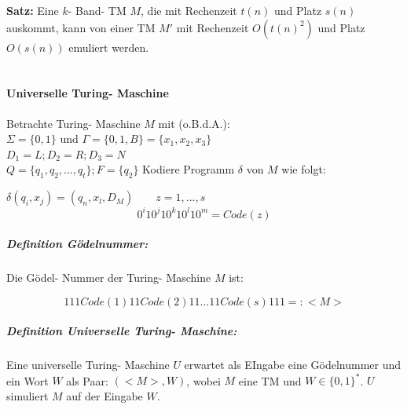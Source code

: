 \documentclass[fleqn]{scrartcl}
\begin{document}
\textbf{Satz:} Eine $k$- Band- TM $M$, die mit Rechenzeit $t(n)$ und Platz $s(n)$ auskommt, kann von einer TM $M'$ mit Rechenzeit $O(t(n)^2)$ und Platz $O(s(n))$ emuliert werden.\\\\
 
 \newpage
\paragraph{Universelle Turing- Maschine}
Betrachte Turing- Maschine $M$ mit (o.B.d.A.):\\
$\Sigma = \{0, 1\}$ und $\Gamma = \{0, 1, B\} = \{x_1, x_2, x_3\}$\\
$D_1 = L; D_2 = R; D_3 = N$\\
$Q = \{q_1, q_2, ..., q_t\}; F = \{q_2\}$
Kodiere Programm $\delta$ von $M$ wie folgt:

$\delta (q_i, x_j) = (q_n, x_l, D_M) \quad \quad z = 1, ..., s$
\[0^i10^j10^k10^l10^m = Code(z)\]

\subparagraph{Definition Gödelnummer:} Die Gödel- Nummer der Turing- Maschine $M$ ist: 

\[111Code(1)11Code(2)11...11Code(s)111 =: <M>\] 

\subparagraph{Definition Universelle Turing- Maschine:} Eine universelle Turing- Maschine $U$ erwartet als EIngabe eine Gödelnummer und ein Wort $W$ als Paar: $(<M>, W)$, wobei $M$ eine TM und $W \in \{0, 1\}^*$. $U$ simuliert $M$ auf der Eingabe $W$.
\end{document}
